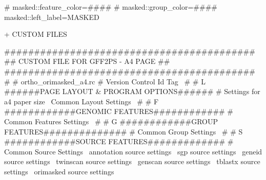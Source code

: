 \documentclass[11pt]{article}
\def\nwendcode{\endtrivlist \endgroup} %
\let\nwdocspar=\par                    %
\begin{document}
\nwenddocs{}\endmoddef
# masked::feature_color=####
# masked::group_color=####
masked::left_label=MASKED
\nwendcode{}\nwdocspar

+ CUSTOM FILES

\nwenddocs{}\endmoddef
##########################################
##   CUSTOM FILE FOR GFF2PS - A4 PAGE   ##
##########################################
#
# ortho_orimasked_a4.rc
#
\LA{}Version Control Id Tag~{\nwtagstyle{}}\RA{}
#
# L ######PAGE LAYOUT & PROGRAM OPTIONS######
#
\LA{}Settings for a4 paper size~{\nwtagstyle{}}\RA{}
\LA{}Common Layout Settings~{\nwtagstyle{}}\RA{}
#
# F ############GENOMIC FEATURES############
#
\LA{}Common Features Settings~{\nwtagstyle{}}\RA{}
#
# G ############GROUP FEATURES##############
#
\LA{}Common Group Settings~{\nwtagstyle{}}\RA{}
#
# S ############SOURCE FEATURES#############
#
\LA{}Common Source Settings~{\nwtagstyle{}}\RA{}
\LA{}annotation source settings~{\nwtagstyle{}}\RA{}
\LA{}sgp source settings~{\nwtagstyle{}}\RA{}
\LA{}geneid source settings~{\nwtagstyle{}}\RA{}
\LA{}twinscan source settings~{\nwtagstyle{}}\RA{}
\LA{}genscan source settings~{\nwtagstyle{}}\RA{}
\LA{}tblastx source settings~{\nwtagstyle{}}\RA{}
\LA{}orimasked source settings~{\nwtagstyle{}}\RA{}
\nwendcode{}\nwdocspar
\end{document}
